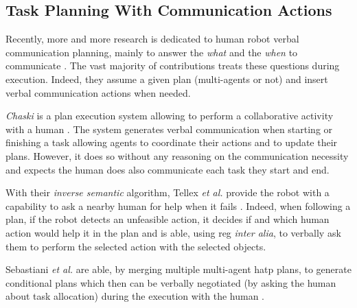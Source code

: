 \documentclass[a4paper,11pt,twoside]{StyleThese}
\begin{document}
\subsection{Task Planning With Communication Actions}

Recently, more and more research is dedicated to human robot verbal communication planning, mainly to answer the \textit{what} and the \textit{when} to communicate \cite{mavridis2015review}. The vast majority of contributions treats these questions during execution. Indeed, they assume a given plan (multi-agents or not) and insert verbal communication actions when needed.


\textit{Chaski} is a plan execution system allowing to perform a collaborative activity with a human \cite{shah2011improved}. The system generates verbal communication when starting or finishing a task allowing agents to coordinate their actions and to update their plans. However, it does so without any reasoning on the communication necessity and expects the human does also communicate each task they start and end.


With their \textit{inverse semantic} algorithm, Tellex \textit{et al.} provide the robot with a capability to ask a nearby human for help when it fails \cite{tellex2014asking}. Indeed, when following a plan, if the robot detects an unfeasible action, it decides if and which human action would help it in the plan and is able, using \acrshort{reg} \textit{inter alia}, to verbally ask them to perform the selected action with the selected objects. 


Sebastiani \textit{et al.} are able, by merging multiple multi-agent \acrshort{hatp} plans, to generate conditional plans which then can be verbally negotiated (by asking the human about task allocation) during the execution with the human \cite{sebastiani2017dealing}. 
\end{document}
